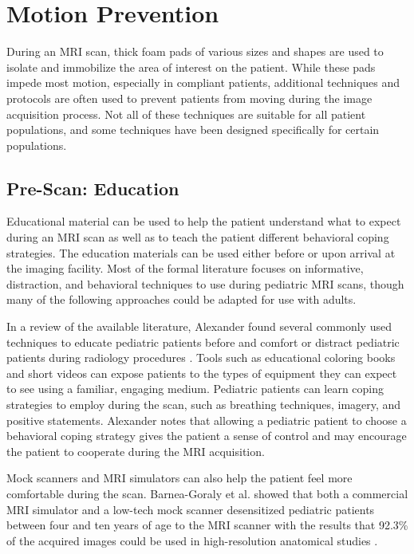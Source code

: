 \section{Motion Prevention}

During an MRI scan, thick foam pads of various sizes and shapes are used to isolate and immobilize the area of interest on the patient. While these pads impede most motion, especially in compliant patients, additional techniques and protocols are often used to prevent patients from moving during the image acquisition process. Not all of these techniques are suitable for all patient populations, and some techniques have been designed specifically for certain populations.

\subsection{Pre-Scan: Education}

Educational material can be used to help the patient understand what to expect during an MRI scan as well as to teach the patient different behavioral coping strategies. The education materials can be used either before or upon arrival at the imaging facility. Most of the formal literature focuses on informative, distraction, and behavioral techniques to use during pediatric MRI scans, though many of the following approaches could be adapted for use with adults.

In a review of the available literature, Alexander found several commonly used techniques to educate pediatric patients before and comfort or distract pediatric patients during radiology procedures \cite{Alexander2012}. Tools such as educational coloring books and short videos can expose patients to the types of equipment they can expect to see using a familiar, engaging medium. Pediatric patients can learn coping strategies to employ during the scan, such as breathing techniques, imagery, and positive statements. Alexander notes that allowing a pediatric patient to choose a behavioral coping strategy gives the patient a sense of control and may encourage the patient to cooperate during the MRI acquisition.

Mock scanners and MRI simulators can also help the patient feel more comfortable during the scan. Barnea-Goraly et al. showed that both a commercial MRI simulator and a low-tech mock scanner desensitized pediatric patients between four and ten years of age to the MRI scanner with the results that 92.3\% of the acquired images could be used in high-resolution anatomical studies \cite{Barnea-Goraly2014}. 

